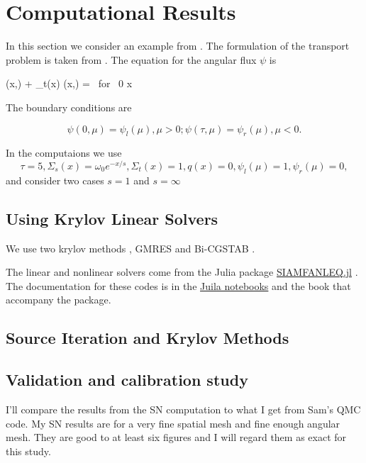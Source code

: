 \section{Computational Results}
\label{sec:results}
In this section we consider an example from
\cite{cesinh}. The formulation of the transport
problem is taken from \cite{ctk:jeff1}. The equation for the angular
flux \(\psi\) is

\begeq
\label{eq:transportgs}
\mu {} (x,\mu) + \Sigma_t(x) \psi(x,\mu) =
 
 \mbox{ for } 0 \le x \le \tau
\endeq

The boundary conditions are

\[
\psi(0, \mu) = \psi_l(\mu), \mu > 0; \psi(\tau, \mu) = \psi_r(\mu),
\mu < 0.
\]

In the computaions we use
\[
\tau=5, \Sigma_s(x) =\omega_0 e^{-x/s},  \Sigma_t(x) = 1, q(x) = 0, \psi_l(\mu) = 1, \psi_r(\mu) = 0,
\]
and consider two cases $s=1$ and $s=\infty$ 

\subsection{Using Krylov Linear Solvers}
\label{subsec:krylov}

We use two krylov methods \cite{ctk:roots}, GMRES \cite{gmres} and
Bi-CGSTAB \cite{bicgstab}.

The linear and nonlinear solvers come from the Julia package
\href{https://github.com/ctkelley/SIAMFANLEquations.jl}{SIAMFANLEQ.jl}
\cite{ctk:siamfanl}. The documentation for these codes is in the
\href{https://github.com/ctkelley/NotebookSIAMFANL}{Juila notebooks}
\cite{ctk:notebooknl} and the book \cite{ctk:fajulia}
that accompany the package. 

\subsection{Source Iteration and Krylov Methods}


\subsection{Validation and calibration study}
\label{validation-and-calibration-study}

I'll compare the results from the SN computation to what I get from
Sam's QMC code. My SN results are for a very fine spatial mesh and fine
enough angular mesh. They are good to at least six figures and I will
regard them as exact for this study.

